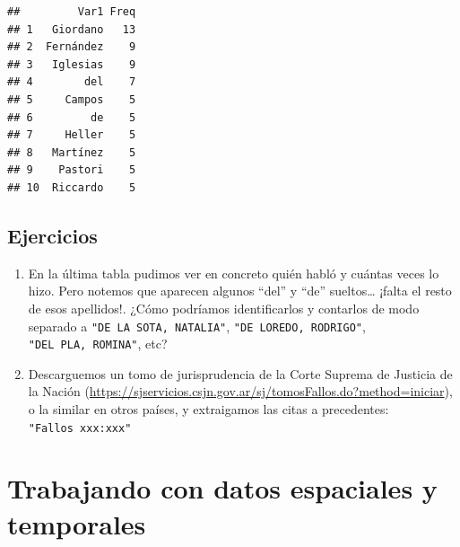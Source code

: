 \documentclass[
]{book}
\begin{document}
\begin{verbatim}
##         Var1 Freq
## 1   Giordano   13
## 2  Fernández    9
## 3   Iglesias    9
## 4        del    7
## 5     Campos    5
## 6         de    5
## 7     Heller    5
## 8   Martínez    5
## 9    Pastori    5
## 10  Riccardo    5
\end{verbatim}

\hypertarget{ejercicios-3}{%
\section{Ejercicios}\label{ejercicios-3}}

\begin{enumerate}
\def\labelenumi{\arabic{enumi}.}
\item
  En la última tabla pudimos ver en concreto quién habló y cuántas veces lo hizo. Pero notemos que aparecen algunos ``del'' y ``de'' sueltos\ldots{} ¡falta el resto de esos apellidos!. ¿Cómo podríamos identificarlos y contarlos de modo separado a \texttt{"DE\ LA\ SOTA,\ NATALIA"}, \texttt{"DE\ LOREDO,\ RODRIGO"}, \texttt{"DEL\ PLA,\ ROMINA"}, etc?
\item
  Descarguemos un tomo de jurisprudencia de la Corte Suprema de Justicia de la Nación (\url{https://sjservicios.csjn.gov.ar/sj/tomosFallos.do?method=iniciar}), o la similar en otros países, y extraigamos las citas a precedentes: \texttt{"Fallos\ xxx:xxx"}
\end{enumerate}

\hypertarget{trabajando-con-datos-espaciales-y-temporales}{%
\chapter{Trabajando con datos espaciales y temporales}\label{trabajando-con-datos-espaciales-y-temporales}}
\end{document}
